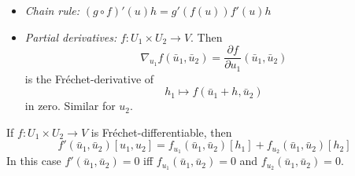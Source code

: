 \documentclass[../skript.tex]{subfiles}
\begin{document}
\begin{itemize}
\item \emph{Chain rule:} $(g \circ f)'(u) h = g'(f(u)) f'(u)h$
\item \emph{Partial derivatives:} $f : U_1 \times U_2 \to V$. Then
\[
	\nabla_{u_1} f(\bar{u}_1, \bar{u}_2) = \frac{\partial f}{\partial u_1}(\bar{u}_1, \bar{u}_2)
\]
is the Fréchet-derivative of
\[
	h_1 \mapsto f(\bar{u}_1 + h, \bar{u}_2)
\]
in zero. Similar for $u_2$.
\end{itemize}
\begin{proposition} %
\label{prop:c1e22}
If $f : U_1 \times U_2 \to V$ is Fréchet-differentiable, then
\[
	f'(\bar{u}_1, \bar{u}_2)[u_1, u_2] = f_{u_1} (\bar{u}_1, \bar{u}_2)[h_1] + f_{u_2} (\bar{u}_1, \bar{u}_2)[h_2]
\]
In this case $f'(\bar{u}_1, \bar{u}_2) = 0$ \ac{iff} $f_{u_1}(\bar{u}_1, \bar{u}_2) = 0$ and $f_{u_2}(\bar{u}_1, \bar{u}_2) = 0$.
\end{proposition}
\end{document}
